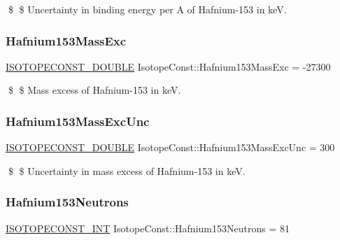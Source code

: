 \$ \$ Uncertainty in binding energy per A of Hafnium-\/153 in keV. \mbox{\label{group___isotope_const-_hafnium-_hf153_ga3605cd9be2d50f8f7aff22da14bacecf}} 
\subsubsection{\texorpdfstring{Hafnium153\+Mass\+Exc}{Hafnium153MassExc}}
{\footnotesize\ttfamily \mbox{\hyperlink{group___isotope_const-_macros_ga8f45a7272ce02c0b4c65c44636ed719a}{I\+S\+O\+T\+O\+P\+E\+C\+O\+N\+S\+T\+\_\+\+D\+O\+U\+B\+LE}} Isotope\+Const\+::\+Hafnium153\+Mass\+Exc = -\/27300}

\$ \$ Mass excess of Hafnium-\/153 in keV. \mbox{\label{group___isotope_const-_hafnium-_hf153_ga6986161cf2350d023548b78851e3dd7b}} 
\subsubsection{\texorpdfstring{Hafnium153\+Mass\+Exc\+Unc}{Hafnium153MassExcUnc}}
{\footnotesize\ttfamily \mbox{\hyperlink{group___isotope_const-_macros_ga8f45a7272ce02c0b4c65c44636ed719a}{I\+S\+O\+T\+O\+P\+E\+C\+O\+N\+S\+T\+\_\+\+D\+O\+U\+B\+LE}} Isotope\+Const\+::\+Hafnium153\+Mass\+Exc\+Unc = 300}

\$ \$ Uncertainty in mass excess of Hafnium-\/153 in keV. \mbox{\label{group___isotope_const-_hafnium-_hf153_gaff8d6baf53cd5f2fe7b3f9619e452195}} 
\subsubsection{\texorpdfstring{Hafnium153\+Neutrons}{Hafnium153Neutrons}}
{\footnotesize\ttfamily \mbox{\hyperlink{group___isotope_const-_macros_ga5f18360b3e99483a35c32d789e62621c}{I\+S\+O\+T\+O\+P\+E\+C\+O\+N\+S\+T\+\_\+\+I\+NT}} Isotope\+Const\+::\+Hafnium153\+Neutrons = 81}

